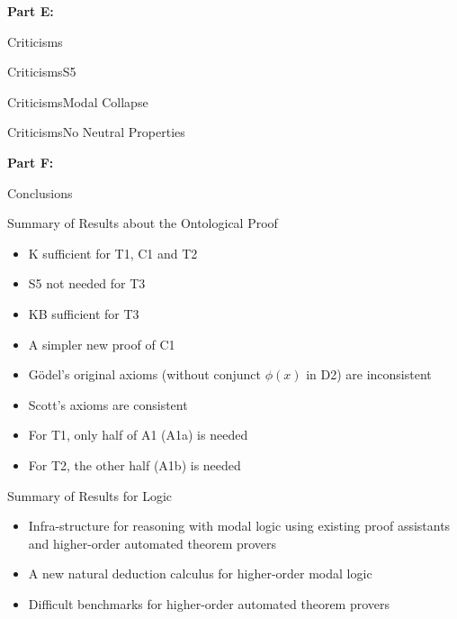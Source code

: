 \begin{transitionframe}
\textbf{Part E:}

Criticisms
\end{transitionframe}

\begin{frame}{Criticisms}{S5}

\end{frame}


\begin{frame}{Criticisms}{Modal Collapse}

\end{frame}


\begin{frame}{Criticisms}{No Neutral Properties}

\end{frame}



\begin{transitionframe}
\textbf{Part F:}

Conclusions
\end{transitionframe}



\begin{frame}{Summary of Results about the Ontological Proof}
\begin{itemize}[<+->]
\item K sufficient for T1, C1 and T2 
\item S5 not needed for T3
\item KB sufficient for T3 
\item A simpler new proof of C1
\item G\"odel's original axioms (without conjunct $\phi(x)$ in D2) are inconsistent
\item Scott's axioms are consistent
\item For T1, only half of A1 (A1a) is needed 
\item For T2, the other half (A1b) is needed
\end{itemize}
\end{frame}


\begin{frame}{Summary of Results for Logic} \small
\begin{itemize}[<+->]
\item Infra-structure for reasoning with modal logic using existing proof assistants and higher-order automated theorem provers
\item A new natural deduction calculus for higher-order modal logic
\item Difficult benchmarks for higher-order automated theorem provers
\end{itemize}
\end{frame}

